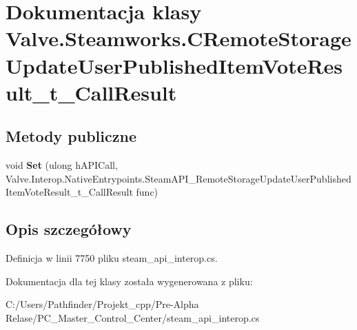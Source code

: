 \hypertarget{class_valve_1_1_steamworks_1_1_c_remote_storage_update_user_published_item_vote_result__t___call_result}{}\section{Dokumentacja klasy Valve.\+Steamworks.\+C\+Remote\+Storage\+Update\+User\+Published\+Item\+Vote\+Result\+\_\+t\+\_\+\+Call\+Result}
\label{class_valve_1_1_steamworks_1_1_c_remote_storage_update_user_published_item_vote_result__t___call_result}
\subsection*{Metody publiczne}
\begin{DoxyCompactItemize}
\item 
\mbox{\label{class_valve_1_1_steamworks_1_1_c_remote_storage_update_user_published_item_vote_result__t___call_result_a13eb2062af8105d1d784ff42a13e5604}} 
void {\bfseries Set} (ulong h\+A\+P\+I\+Call, Valve.\+Interop.\+Native\+Entrypoints.\+Steam\+A\+P\+I\+\_\+\+Remote\+Storage\+Update\+User\+Published\+Item\+Vote\+Result\+\_\+t\+\_\+\+Call\+Result func)
\end{DoxyCompactItemize}


\subsection{Opis szczegółowy}


Definicja w linii 7750 pliku steam\+\_\+api\+\_\+interop.\+cs.



Dokumentacja dla tej klasy została wygenerowana z pliku\+:\begin{DoxyCompactItemize}
\item 
C\+:/\+Users/\+Pathfinder/\+Projekt\+\_\+cpp/\+Pre-\/\+Alpha Relase/\+P\+C\+\_\+\+Master\+\_\+\+Control\+\_\+\+Center/steam\+\_\+api\+\_\+interop.\+cs\end{DoxyCompactItemize}
